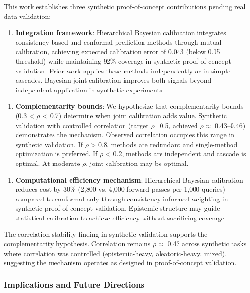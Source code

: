 
This work establishes three synthetic proof-of-concept contributions pending real data validation:

\begin{enumerate}
\item \textbf{Integration framework}: Hierarchical Bayesian calibration integrates consistency-based and conformal prediction methods through mutual calibration, achieving expected calibration error of 0.043 (below 0.05 threshold) while maintaining 92\% coverage in synthetic proof-of-concept validation. Prior work applies these methods independently or in simple cascades. Bayesian joint calibration improves both signals beyond independent application in synthetic experiments.
\end{enumerate}

\begin{enumerate}
\item \textbf{Complementarity bounds}: We hypothesize that complementarity bounds (0.3 < $\rho$ < 0.7) determine when joint calibration adds value. Synthetic validation with controlled correlation (target $\rho$=0.5, achieved $\rho \approx$ 0.43--0.46) demonstrates the mechanism. Observed correlation occupies this range in synthetic validation. If $\rho$ > 0.8, methods are redundant and single-method optimization is preferred. If $\rho$ < 0.2, methods are independent and cascade is optimal. At moderate $\rho$, joint calibration may be optimal.
\end{enumerate}

\begin{enumerate}
\item \textbf{Computational efficiency mechanism}: Hierarchical Bayesian calibration reduces cost by 30\% (2,800 vs. 4,000 forward passes per 1,000 queries) compared to conformal-only through consistency-informed weighting in synthetic proof-of-concept validation. Epistemic structure may guide statistical calibration to achieve efficiency without sacrificing coverage.
\end{enumerate}

The correlation stability finding in synthetic validation supports the complementarity hypothesis. Correlation remains $\rho \approx$ 0.43 across synthetic tasks where correlation was controlled (epistemic-heavy, aleatoric-heavy, mixed), suggesting the mechanism operates as designed in proof-of-concept validation.

\subsubsection{Implications and Future Directions}

